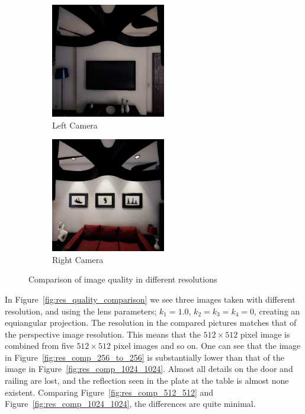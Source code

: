 \begin{figure}[!htb]
\begin{subfigure}{0.32\textwidth}
        \centering
        \includegraphics[height=5cm]{rapport/fig/Results/left_center.jpeg}
        \caption{Left Camera}
        \label{fig:res_original_left}
    \end{subfigure}
    \begin{subfigure}{0.32\textwidth}
        \centering
        \includegraphics[height=5cm]{rapport/fig/Results/right_center.jpeg}
        \caption{Right Camera}
        \label{fig:res_original_right}
    \end{subfigure}
    \centering
    \caption{Comparison of image quality in different resolutions}
    \label{fig:res_original_pictures}
\end{figure}

In Figure~\ref{fig:res_quality_comparison} we see three images taken with different resolution, and using the lens parameters; $k_1 = 1.0$, $k_2=k_3=k_4=0$, creating an equiangular projection. The resolution in the compared pictures matches that of the perspective image resolution. This means that the $512\times512$ pixel image is combined from five $512\times512$ pixel images and so on. One can see that the image in Figure~\ref{fig:res_comp_256_to_256} is substantially lower than that of the image in Figure~\ref{fig:res_comp_1024_1024}. Almost all details on the door and railing are lost, and the reflection seen in the plate at the table is almost none existent. Comparing Figure~\ref{fig:res_comp_512_512} and Figure~\ref{fig:res_comp_1024_1024}, the differences are quite minimal.

